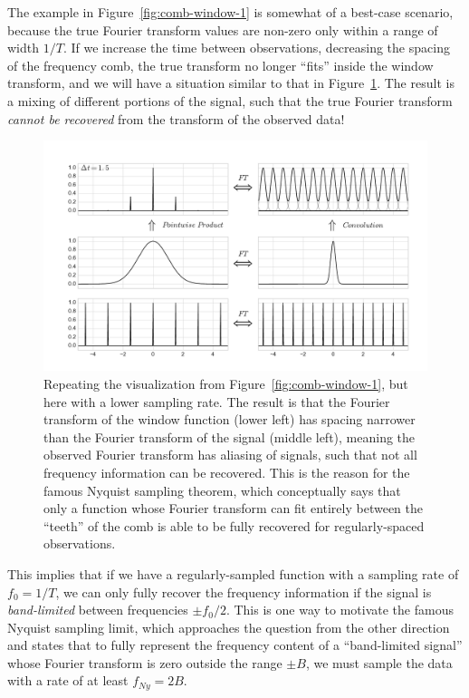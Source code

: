\documentclass[preprint]{aastex}
\newcommand{\fig}[1]{Figure~\ref{fig:#1}}
\newcommand{\figlabel}[1]{\label{fig:#1}}
\begin{document}
The example in \fig{comb-window-1} is somewhat of a best-case scenario, because
the true Fourier transform values are non-zero only within a range of
width $1/T$.
If we increase the time between observations, decreasing the spacing of the
frequency comb, the true transform no longer ``fits'' inside the window
transform, and we will have a situation similar to that in \fig{comb-window-2}.
The result is a mixing of different portions of the signal, such that
the true Fourier transform {\it cannot be recovered}
from the transform of the observed data!

\begin{figure}[ht]
  \centering
  \includegraphics[width=\textwidth]{fig08_comb_window_2}
  \caption{Repeating the visualization from \fig{comb-window-1}, but here with
    a lower sampling rate. The result is that the Fourier transform of the
    window function (lower left) has spacing narrower than the Fourier transform
    of the signal (middle left), meaning the observed Fourier transform has
    aliasing of signals, such that not all frequency information can be
    recovered. This is the reason for the famous Nyquist sampling theorem,
    which conceptually says that only a function whose Fourier transform can
    fit entirely between the ``teeth'' of the comb is able to be fully
    recovered for regularly-spaced observations.
    \figlabel{comb-window-2}}
\end{figure}

This implies that if we have a regularly-sampled function with a sampling
rate of $f_0 = 1/T$, we can only fully recover the frequency information
if the signal is {\it band-limited} between frequencies $\pm f_0/2$.
This is one way to motivate the famous Nyquist sampling limit, which
approaches the question from the other direction and states
that to fully represent the frequency content of a ``band-limited signal''
whose Fourier transform is zero outside the range $\pm B$,
we must sample the data with a rate of at least $f_{Ny} = 2B$.
\end{document}
